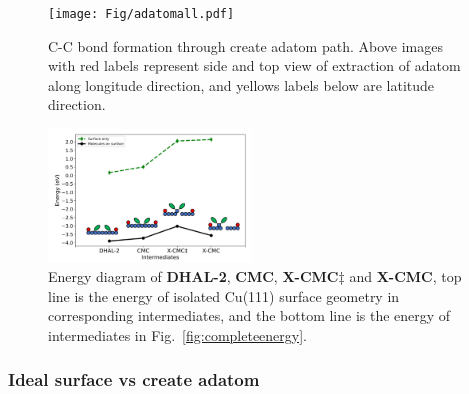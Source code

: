\documentclass[%
 reprint,
 amsmath,amssymb,
 aps,
prb,
floatfix,
]{revtex4-2}
\begin{document}
\begin{figure}[hbt]
\centering
\texttt{[image: Fig/adatomall.pdf]}
\caption{C-C bond formation through create adatom path. Above images with red labels represent side and top view of extraction of adatom along longitude direction, and yellows labels below are latitude direction.}
\label{fig:bondformadatom}
\end{figure}


\begin{figure}[hbt]
\centering
\includegraphics[width=0.48\textwidth]{Fig/onlysurface.pdf}
\caption{Energy diagram of \textbf{DHAL-2}, \textbf{CMC}, \textbf{X-CMC$\ddagger$} and \textbf{X-CMC}, top line is the energy of isolated Cu(111) surface geometry in corresponding intermediates, and the bottom line is the energy of intermediates in Fig.~\ref{fig:completeenergy}.}
\label{fig:onlysurface}
\end{figure}



\subsubsection{Ideal surface vs create adatom}
\end{document}
